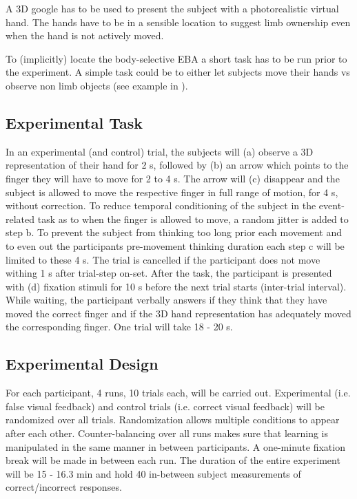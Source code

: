 \documentclass[man]{apa7}
\begin{document}
A 3D google has to be used to present the subject with a photorealistic virtual hand. The hands have to be in a sensible location to suggest limb ownership even when the hand is not actively moved.

To (implicitly) locate the body-selective EBA a short task has to be run prior to the experiment. A simple task could be to either let subjects move their hands vs observe non limb objects (see example in \cite{Limanowski2016}).

\subsection{Experimental Task}

In an experimental (and control) trial, the subjects will (a) observe a 3D representation of their hand for 2 s, followed by (b) an arrow which points to the finger they will have to move for 2 to 4 s. The arrow will (c) disappear and the subject is allowed to move the respective finger in full range of motion, for 4 s, without correction. To reduce temporal conditioning of the subject in the event-related task as to when the finger is allowed to move, a random jitter is added to step b. To prevent the subject from thinking too long prior each movement and to even out the participants pre-movement thinking duration each step c will be limited to these 4 s. The trial is cancelled if the participant does not move withing 1 s after trial-step on-set. After the task, the participant is presented with (d) fixation stimuli for 10 s before the next trial starts (inter-trial interval). While waiting, the participant verbally answers if they think that they have moved the correct finger and if the 3D hand representation has adequately moved the corresponding finger. One trial will take 18 - 20 s.

\subsection{Experimental Design}

For each participant, 4 runs, 10 trials each, will be carried out. Experimental (i.e. false visual feedback) and control trials (i.e. correct visual feedback) will be randomized over all trials. Randomization allows multiple conditions to appear after each other. Counter-balancing over all runs makes sure that learning is manipulated in the same manner in between participants. A one-minute fixation break will be made in between each run. The duration of the entire experiment will be 15 - 16.3 min and hold 40 in-between subject measurements of correct/incorrect responses.
\end{document}

